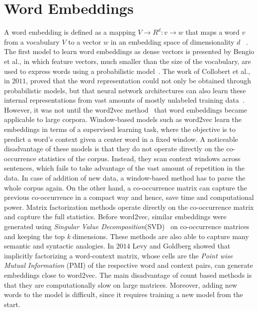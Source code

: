 \section{Word Embeddings}
\label{sec:wordembeddig}
A word embedding is defined as a mapping $ V\rightarrow { R }^{ d }:v \rightarrow w $ that maps a word $v$ from a vocabulary $V$ to a vector  $w$  in an embedding space of dimensionality $d$ ~. The first model to learn word embeddings as dense vectors is presented by Bengio et al., in which feature vectors, much smaller than the size of the vocabulary, are used to express words using a probabilistic model~. The work of Collobert et al., in $2011$, proved that the word representation could not only be obtained through probabilistic models, but that neural network architectures can also learn these internal representations from vast amounts of mostly unlabeled training data~. However, it was not until the word2vec method~ that word embeddings became applicable to large corpora. 
Window-based models such as word2vec learn the embeddings in terms of a supervised learning task, where the objective is to predict a word's context given a center word in a fixed window. A noticeable disadvantage of these models is that they do not operate directly on the co-occurrence statistics of the corpus. Instead, they scan context windows across sentences, which fails to take advantage of the vast amount of repetition in the data. In case of addition of new data, a window-based method has to parse the whole corpus again. On the other hand, a co-occurrence matrix can capture the previous co-occurrence in a compact way and hence, save time and computational power. Matrix factorization methods operate directly on the co-occurrence matrix and capture the full statistics. Before word2vec, similar embeddings were generated using \emph{Singular Value Decomposition}(SVD)~ on co-occurrence matrices and keeping the top \emph{k} dimensions. These methods are also able to capture many semantic and syntactic analogies. In $2014$ Levy and Goldberg showed that implicitly factorizing a word-context matrix, whose cells are the \emph{Point wise Mutual Information} (PMI) of the respective word and context pairs, can generate embeddings close to word2vec.
The main disadvantage of count based methods is that they are computationally slow on large matrices. Moreover, adding new words to the model is difficult, since it requires training a new model from the start.\\

